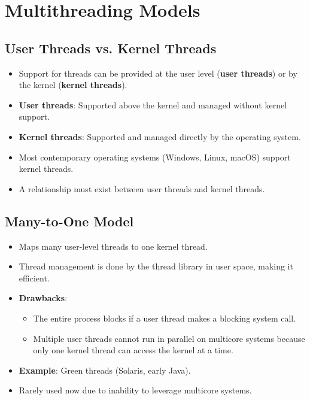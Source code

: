 \section{Multithreading Models}\label{sec:4.3}

\subsection{User Threads vs. Kernel Threads}
\begin{itemize}
    \item Support for threads can be provided at the user level (\textbf{user threads}) or by the kernel (\textbf{kernel threads}).
    \item \textbf{User threads}: Supported above the kernel and managed without kernel support.
    \item \textbf{Kernel threads}: Supported and managed directly by the operating system.
    \item Most contemporary operating systems (Windows, Linux, macOS) support kernel threads.
    \item A relationship must exist between user threads and kernel threads.
\end{itemize}

\subsection{Many-to-One Model}
\begin{itemize}
    \item Maps many user-level threads to one kernel thread.
    \item Thread management is done by the thread library in user space, making it efficient.
    \item \textbf{Drawbacks}:
        \begin{itemize}
            \item The entire process blocks if a user thread makes a blocking system call.
            \item Multiple user threads cannot run in parallel on multicore systems because only one kernel thread can access the kernel at a time.
        \end{itemize}
    \item \textbf{Example}: Green threads (Solaris, early Java).
    \item Rarely used now due to inability to leverage multicore systems.
\end{itemize}

